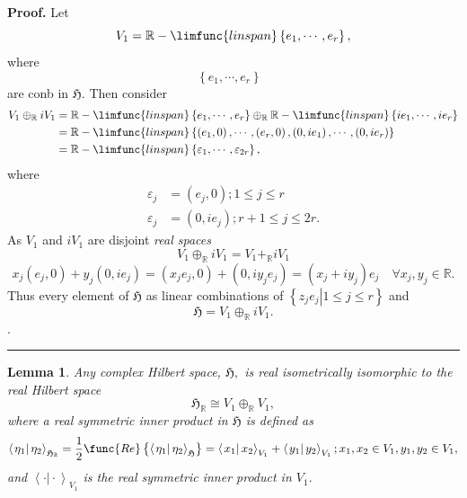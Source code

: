 \documentclass[aps,preprint]{revtex4}
\newtheorem{lemma}[theorem]{Lemma}
\newenvironment{proof}[1][Proof]{\noindent\textbf{#1.} }{\ \rule{0.5em}{0.5em}}
\begin{document}
\begin{proof}
Let 
\begin{equation}
V_{1}=\mathbb{R}-\limfunc{linspan}\left\{ e_{1},\cdots,e_{r}\right\} ,
\end{equation}
where 
\begin{equation}
\left\{ e_{1},\cdots,e_{r}\right\} \text{ }
\end{equation}
are conb in $\mathfrak{H.}$ Then consider 
\begin{align}
V_{1}\oplus_{\mathbb{R}}iV_{1} & =\mathbb{R}-\limfunc{linspan}\left\{
e_{1},\cdots,e_{r}\right\} \oplus_{\mathbb{R}}\mathbb{R}-\limfunc{linspan}%
\left\{ ie_{1},\cdots,ie_{r}\right\} \\
& =\mathbb{R}-\limfunc{linspan}\left\{ \left( e_{1},0\right) ,\cdots,\left(
e_{r},0\right) ,\left( 0,ie_{1}\right) ,\cdots,\left( 0,ie_{r}\right)
\right\} \\
& =\mathbb{R}-\limfunc{linspan}\left\{ \varepsilon_{1},\cdots
,\varepsilon_{2r}\right\} ,
\end{align}
where 
\begin{align*}
\varepsilon_{j} & =\left( e_{j},0\right) ;1\leq j\leq r \\
\varepsilon_{j} & =\left( 0,ie_{j}\right) ;r+1\leq j\leq2r.
\end{align*}
As $V_{1}$ and $iV_{1}$ are disjoint \emph{real spaces} 
\begin{equation}
V_{1}\oplus_{\mathbb{R}}iV_{1}=V_{1}+_{\mathbb{R}}iV_{1}
\end{equation}%
\begin{equation}
x_{j}\left( e_{j},0\right) +y_{j}\left( 0,ie_{j}\right) =\left(
x_{j}e_{j},0\right) +\left( 0,iy_{j}e_{j}\right) =\left( x_{j}+iy_{j}\right)
e_{j}\quad\forall x_{j},y_{j}\in\mathbb{R}.
\end{equation}
Thus every element of $\mathfrak{H}$ as linear combinations of $\left\{
\left. z_{j}e_{j}\right\vert 1\leq j\leq r\right\} $ and 
\begin{equation}
\mathfrak{H}=V_{1}\oplus_{\mathbb{R}}iV_{1}.
\end{equation}
$.$
\end{proof}

\begin{lemma}
Any complex Hilbert space, $\mathfrak{H,}$ is real isometrically isomorphic
to the real Hilbert space 
\begin{equation}
\mathfrak{H}_{\mathbb{R}}\cong V_{1}\oplus _{\mathbb{R}}V_{1},
\end{equation}%
where a real symmetric inner product in $\mathfrak{H}$ is defined as%
\begin{equation}
\left\langle \left. \eta _{1}\right\vert \eta _{2}\right\rangle _{\mathfrak{H%
}_{\mathbb{R}}}=\frac{1}{2}\func{Re}\left\{ \left\langle \left. \eta
_{1}\right\vert \eta _{2}\right\rangle _{\mathfrak{H}}\right\} =\left\langle
\left. x_{1}\right\vert x_{2}\right\rangle _{V_{1}}+\left\langle \left.
y_{1}\right\vert y_{2}\right\rangle _{V_{1}};x_{1},x_{2}\in
V_{1},y_{1},y_{2}\in V_{1},
\end{equation}%
and $\left\langle \left. \cdot \right\vert \cdot \right\rangle _{V_{1}}$ is
the real symmetric inner product in $V_{1}.$
\end{lemma}
\end{document}
